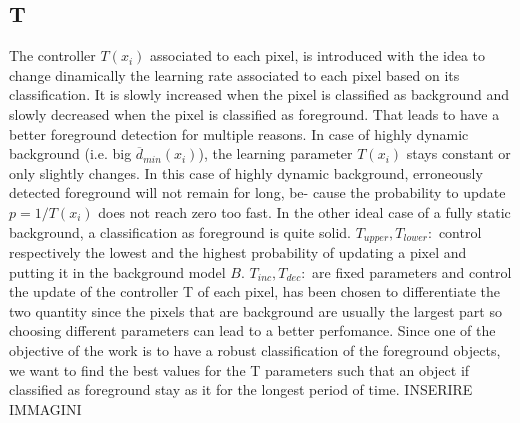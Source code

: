 \subsection*{T}
The controller $T(x_i)$ associated to each pixel, is introduced with the idea to change dinamically the learning rate associated to each pixel based on its classification. It is slowly increased when the pixel is classified as background and slowly decreased when the pixel is classified as foreground. That leads to have a better foreground detection for multiple reasons. \newline
In case of highly dynamic background (i.e. big $\overline{d}_{min}(x_i)$), the learning parameter $T(x_i)$ stays constant or only slightly changes. In this case of highly dynamic background, erroneously detected foreground will not remain for long, be-
cause the probability to update $p = 1/T(x_i)$ does not reach
zero too fast. \newline
In the other ideal case of a fully static background, a classification as foreground is quite solid. \newline
$T_{upper}, T_{lower}:$ control respectively the lowest and the highest probability of updating a pixel and putting it in the
background model $B$. \newline
$T_{inc}, T_{dec}:$ are fixed parameters and control the update of the controller T of each pixel, has been chosen to differentiate the two quantity since the pixels that are background are usually the largest part so choosing different parameters can lead to a better perfomance.\newline
Since one of the objective of the work is to have a robust classification of the foreground objects, we want to find the best values for the T parameters such that an object if classified as foreground stay as it for the longest period of time. INSERIRE IMMAGINI


